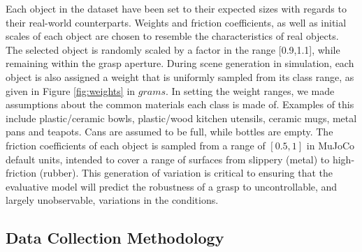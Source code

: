 Each object in the dataset have been set to their expected sizes with regards to their real-world counterparts. Weights and friction coefficients, as well as initial scales of each object are chosen to resemble the characteristics of real objects. The selected object is randomly scaled by a factor in the range [0.9,1.1], while remaining within the grasp aperture. During scene generation in simulation, each object is also assigned a weight that is uniformly sampled from its class range, as given in Figure \ref{fig:weights} in $grams$. In setting the weight ranges, we made assumptions about the common materials each class is made of. Examples of this include plastic/ceramic bowls, plastic/wood kitchen utensils, ceramic mugs, metal pans and teapots. Cans are assumed to be full, while bottles are empty. The friction coefficients of each object is sampled from a range of $[0.5, 1]$ in MuJoCo default units, intended to cover a range of surfaces from slippery (metal) to high-friction (rubber). This generation of variation is critical to ensuring that the evaluative model will predict the robustness of a grasp to uncontrollable, and largely unobservable, variations in the conditions.

\begin{table}[]
\centering
\caption{Weight ranges for each object class (grams). }
\label{fig:weights}
\end{table}



\subsection{Data Collection Methodology}
\label{subsection:dataCollection}

